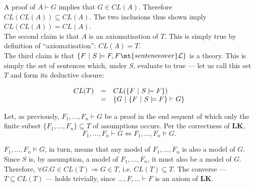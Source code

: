 A proof of $A \vdash G$ implies that $G \in CL(A)$. Therefore $CL(CL(A)) \subseteq CL(A)$. The two inclusions thus shown imply $CL(CL(A)) = CL(A)$.\\

The second claim is that $A$ is an axiomatisation of $T$. This is simply true by definition of ``axiomatisation'': $CL(A) = T$.\\

The third claim is that $\{F\ |\ S \models F, F \mt{ sentence over } \mathcal{L} \}$ is a theory. This is simply the set of sentences which, under $S$, evaluate to true --- let us call this set $T$ and form its deductive closure:

$$
	\begin{array}{l l l}
		CL(T) & = & CL(\{F\ |\ S \models F \})\\
		      & = & \{G\ |\ \{F\ |\ S \models F \} \vdash G \}
	\end{array}
$$

Let, as previously, $F_1,\dots,F_n \vdash G$ be a proof in the end sequent of which only the finite subset $\{F_1,\dots, F_n\} \subseteq T$ of assumptions occurs. Per the correctness of \textbf{LK}, $$F_1,\dots,F_n \vdash G \Leftrightarrow F_1,\dots,F_n \models G.$$

$F_1,\dots,F_n \models G$, in turn, means that any model of $F_1,\dots,F_n$ is also a model of $G$. Since $S$ is, by assumption, a model of $F_1,\dots,F_n$, it must also be a model of $G$. Therefore, $\forall G. G \in CL(T) \Rightarrow G \in T$, i.e. $CL(T) \subseteq T$. The converse --- $T \subseteq CL(T)$ --- holds trivially, since $\dots,F,\dots \vdash F$ is an axiom of \textbf{LK}.

